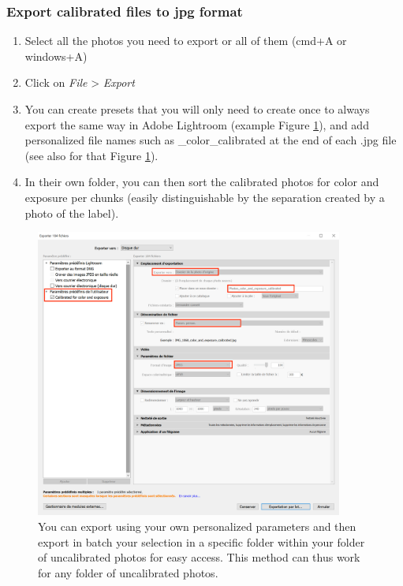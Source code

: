 \documentclass[10pt,letter,english]{article}
\begin{document}
\subsubsection{Export calibrated files to jpg format}

\begin{enumerate}
    \item Select all the photos you need to export or all of them (cmd+A or windows+A)
    \item Click on \textit{File} > \textit{Export}
    \item You can create presets that you will only need to create once to always export the same way in Adobe Lightroom (example Figure \ref{export_parameters}), and add personalized file names such as \_color\_calibrated at the end of each .jpg file (see also for that Figure \ref{export_parameters}).
    \item In their own folder, you can then sort the calibrated photos for color and exposure per chunks (easily distinguishable by the separation created by a photo of the label).
\end{enumerate}




\begin{figure}[H]
    \centering
    \includegraphics[width=0.9\textwidth]{Figures/export_capture_1.png}
    \caption{You can export using your own personalized parameters and then export in batch your selection in a specific folder within your folder of uncalibrated photos for easy access. This method can thus work for any folder of uncalibrated photos.}
    \label{export_parameters}
\end{figure}
\end{document}

